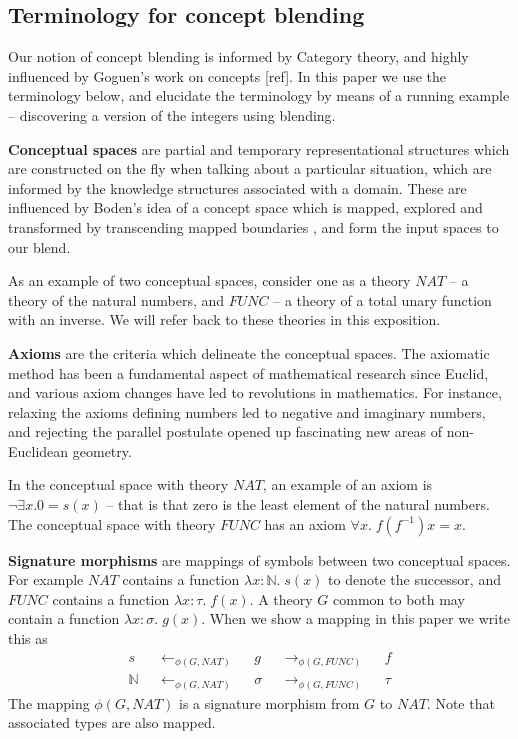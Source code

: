 \subsection{Terminology for concept blending}
Our notion of concept blending is informed by Category theory, and
highly influenced by Goguen's work on concepts [ref]. In this paper we
use the terminology below, and elucidate the terminology by means of a
running example -- discovering a version of the integers using
blending.

{\bf Conceptual spaces} are partial and temporary representational
structures which are constructed on the fly when talking about a
particular situation, which are informed by the knowledge structures
associated with a domain. These are influenced by Boden's idea of a
concept space which is mapped, explored and transformed by
transcending mapped boundaries \cite{boden}, and form the input spaces
to our blend. 

As an example of two conceptual spaces, consider one as a theory $\mathit{NAT}$ --
a theory of the natural numbers, and $\mathit{FUNC}$ -- a theory of a total
unary function with an inverse. We will refer back to these theories
in this exposition.

{\bf Axioms} are the criteria which delineate the conceptual
spaces. The axiomatic method has been a fundamental aspect of
mathematical research since Euclid, and various axiom changes have led
to revolutions in mathematics. For instance, relaxing the axioms
defining numbers led to negative and imaginary numbers, and rejecting
the parallel postulate opened up fascinating new areas of
non-Euclidean geometry.

In the conceptual space with theory $\mathit{NAT}$, an example of an axiom is $\neg \exists x. 0 =
s(x)$ -- that is that zero is the least element of the natural
numbers.  The conceptual space with theory $\mathit{FUNC}$ has an axiom
$\forall x.\;f(f^{-1}) x = x$. 

{\bf Signature morphisms} are mappings of symbols between two
conceptual spaces. For example $\mathit{NAT}$ contains a function $\lambda
x:\mathbb{N}.\;s(x)$ to denote the successor, and $\mathit{FUNC}$ contains a function
$\lambda x:\tau.\;f(x)$. A theory $G$ common to both may contain a function
$\lambda x:\sigma.\;g(x)$. When we show a mapping in this paper we write this
as
\begin{align}
s&&\leftarrow_{\phi(G,\mathit{NAT})}&&g&&\rightarrow_{\phi(G,\mathit{FUNC})}&&f\\
\mathbb{N}&&\leftarrow_{\phi(G,\mathit{NAT})}&&\sigma&&\rightarrow_{\phi(G,\mathit{FUNC})}&&\tau
\end{align}
\noindent The mapping $\phi(G,\mathit{NAT})$ is a signature morphism from
$G$ to $\mathit{NAT}$. Note that associated types are also mapped.


